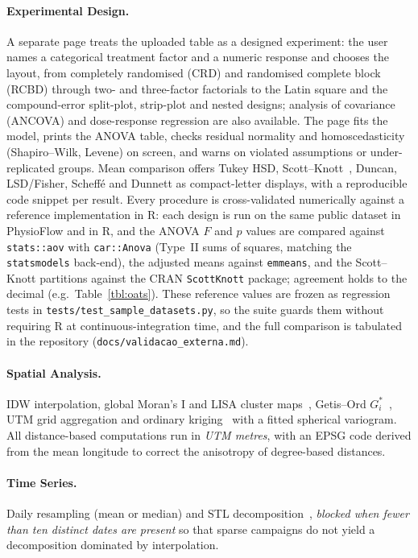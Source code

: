 \documentclass[11pt, letterpaper]{article}
\begin{document}
\paragraph{Experimental Design.} A separate page treats the uploaded table as a designed experiment: the user names a categorical treatment factor and a numeric response and chooses the layout, from completely randomised (CRD) and randomised complete block (RCBD) through two- and three-factor factorials to the Latin square and the compound-error split-plot, strip-plot and nested designs; analysis of covariance (ANCOVA) and dose-response regression are also available. The page fits the model, prints the ANOVA table, checks residual normality and homoscedasticity (Shapiro--Wilk, Levene) on screen, and warns on violated assumptions or under-replicated groups. Mean comparison offers Tukey HSD, Scott--Knott~\cite{ScottKnott1974}, Duncan, LSD/Fisher, Scheff\'e and Dunnett as compact-letter displays, with a reproducible code snippet per result. Every procedure is cross-validated numerically against a reference implementation in R: each design is run on the same public dataset in PhysioFlow and in R, and the ANOVA $F$ and $p$ values are compared against \texttt{stats::aov} with \texttt{car::Anova} (Type~II sums of squares, matching the \texttt{statsmodels} back-end), the adjusted means against \texttt{emmeans}, and the Scott--Knott partitions against the CRAN \texttt{ScottKnott} package; agreement holds to the decimal (e.g.\ Table~\ref{tbl:oats}). These reference values are frozen as regression tests in \texttt{tests/test\_sample\_datasets.py}, so the suite guards them without requiring R at continuous-integration time, and the full comparison is tabulated in the repository (\texttt{docs/validacao\_externa.md}).

\paragraph{Spatial Analysis.} IDW interpolation, global Moran's I and LISA cluster maps~\cite{Anselin1995}, Getis--Ord $G_i^*$~\cite{Getis1992}, UTM grid aggregation and ordinary kriging~\cite{Cressie1993} with a fitted spherical variogram. All distance-based computations run in \emph{UTM metres}, with an EPSG code derived from the mean longitude to correct the anisotropy of degree-based distances.

\paragraph{Time Series.} Daily resampling (mean or median) and STL decomposition~\cite{Cleveland1990STL}, \emph{blocked when fewer than ten distinct dates are present} so that sparse campaigns do not yield a decomposition dominated by interpolation.
\end{document}

